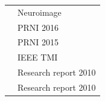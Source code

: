 \documentclass[letterpaper]{article}
\begin{document}
\begin{minipage}{1\linewidth}
\begin{minipage}{0.5\linewidth}
\begin{minipage}{1\linewidth}
\begin{minipage}{1\linewidth}
\begin{tabularx}{\textwidth}{cX}
				& {\normalsize \textmd{Neuroimage}}\\
				& {\normalsize \textmd{PRNI 2016}}\\
				& {\normalsize \textmd{PRNI 2015}}\\
				& {\normalsize \textmd{IEEE TMI}}\\
				& {\normalsize \textmd{Research report 2010}}\\
				& {\normalsize \textmd{Research report 2010}}\\
			\end{tabularx}
		\end{minipage} 
	\end{minipage} %
	
\end{minipage}
\end{minipage}
\end{document}
